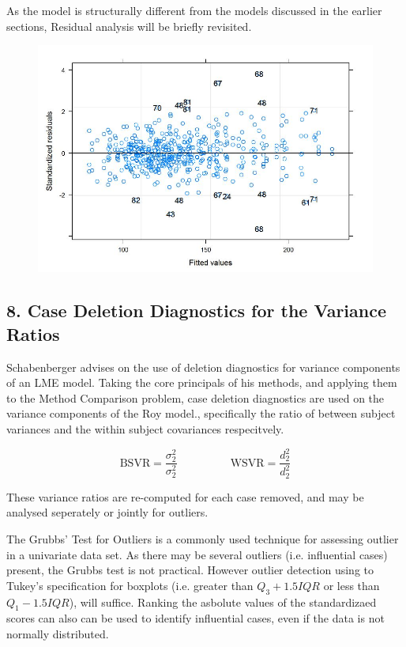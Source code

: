 \documentclass[Main.tex]{subfiles}
\begin{document}
As the model is structurally different from the models discussed in the earlier sections, Residual analysis will be briefly revisited.
\begin{figure}[h!]
\centering
\includegraphics[width=0.7\linewidth]{images/Residuals-JS-Roy}
\caption{}
\label{fig:Residuals-JS-Roy}
\end{figure}

\newpage
\subsection*{8. Case Deletion Diagnostics for the Variance Ratios}

Schabenberger advises on the use of deletion diagnostics for variance components of an LME model.
Taking the core principals of his methods, and applying them to the Method Comparison problem, case deletion diagnostics are used on the variance components of the Roy model., specifically the ratio of between subject variances and the within subject covariances respecitvely.


\[ \mbox{BSVR} = \frac{\sigma^2_2}{\sigma^2_2} \phantom{makespace}  \mbox{WSVR} = \frac{d^2_2}{d^2_2} \]

These variance ratios are re-computed for each case removed, and may be analysed seperately or jointly for outliers. 

The Grubbs' Test for Outliers is a commonly used technique for assessing outlier in a univariate data set. As there may be several outliers (i.e. influential cases) present, the Grubbs test is not practical. However outlier detection using to Tukey's 
specification for boxplots (i.e. greater than $Q_3 +1.5 IQR$ or less than $Q_1 - 1.5 IQR$), will suffice. Ranking the asbolute values of the standardizaed scores can also can be used to identify influential cases, even if the data is not normally distributed.
\end{document}
